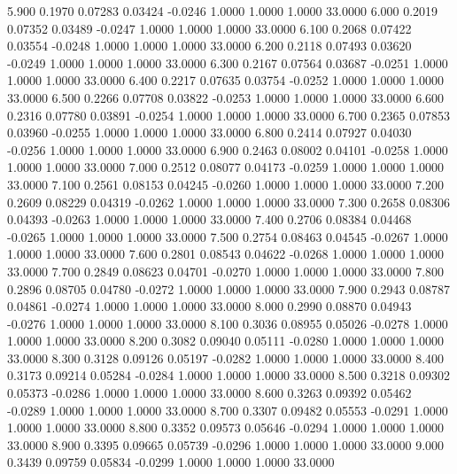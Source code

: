    5.900   0.1970   0.07283   0.03424  -0.0246   1.0000   1.0000   1.0000  33.0000
   6.000   0.2019   0.07352   0.03489  -0.0247   1.0000   1.0000   1.0000  33.0000
   6.100   0.2068   0.07422   0.03554  -0.0248   1.0000   1.0000   1.0000  33.0000
   6.200   0.2118   0.07493   0.03620  -0.0249   1.0000   1.0000   1.0000  33.0000
   6.300   0.2167   0.07564   0.03687  -0.0251   1.0000   1.0000   1.0000  33.0000
   6.400   0.2217   0.07635   0.03754  -0.0252   1.0000   1.0000   1.0000  33.0000
   6.500   0.2266   0.07708   0.03822  -0.0253   1.0000   1.0000   1.0000  33.0000
   6.600   0.2316   0.07780   0.03891  -0.0254   1.0000   1.0000   1.0000  33.0000
   6.700   0.2365   0.07853   0.03960  -0.0255   1.0000   1.0000   1.0000  33.0000
   6.800   0.2414   0.07927   0.04030  -0.0256   1.0000   1.0000   1.0000  33.0000
   6.900   0.2463   0.08002   0.04101  -0.0258   1.0000   1.0000   1.0000  33.0000
   7.000   0.2512   0.08077   0.04173  -0.0259   1.0000   1.0000   1.0000  33.0000
   7.100   0.2561   0.08153   0.04245  -0.0260   1.0000   1.0000   1.0000  33.0000
   7.200   0.2609   0.08229   0.04319  -0.0262   1.0000   1.0000   1.0000  33.0000
   7.300   0.2658   0.08306   0.04393  -0.0263   1.0000   1.0000   1.0000  33.0000
   7.400   0.2706   0.08384   0.04468  -0.0265   1.0000   1.0000   1.0000  33.0000
   7.500   0.2754   0.08463   0.04545  -0.0267   1.0000   1.0000   1.0000  33.0000
   7.600   0.2801   0.08543   0.04622  -0.0268   1.0000   1.0000   1.0000  33.0000
   7.700   0.2849   0.08623   0.04701  -0.0270   1.0000   1.0000   1.0000  33.0000
   7.800   0.2896   0.08705   0.04780  -0.0272   1.0000   1.0000   1.0000  33.0000
   7.900   0.2943   0.08787   0.04861  -0.0274   1.0000   1.0000   1.0000  33.0000
   8.000   0.2990   0.08870   0.04943  -0.0276   1.0000   1.0000   1.0000  33.0000
   8.100   0.3036   0.08955   0.05026  -0.0278   1.0000   1.0000   1.0000  33.0000
   8.200   0.3082   0.09040   0.05111  -0.0280   1.0000   1.0000   1.0000  33.0000
   8.300   0.3128   0.09126   0.05197  -0.0282   1.0000   1.0000   1.0000  33.0000
   8.400   0.3173   0.09214   0.05284  -0.0284   1.0000   1.0000   1.0000  33.0000
   8.500   0.3218   0.09302   0.05373  -0.0286   1.0000   1.0000   1.0000  33.0000
   8.600   0.3263   0.09392   0.05462  -0.0289   1.0000   1.0000   1.0000  33.0000
   8.700   0.3307   0.09482   0.05553  -0.0291   1.0000   1.0000   1.0000  33.0000
   8.800   0.3352   0.09573   0.05646  -0.0294   1.0000   1.0000   1.0000  33.0000
   8.900   0.3395   0.09665   0.05739  -0.0296   1.0000   1.0000   1.0000  33.0000
   9.000   0.3439   0.09759   0.05834  -0.0299   1.0000   1.0000   1.0000  33.0000
